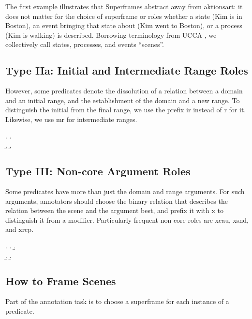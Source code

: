 \documentclass[a4paper]{article}
\begin{document}
The first example illustrates that Superframes abstract away from aktionsart: it does not matter for the choice of superframe or roles whether a state (Kim is in Boston), an event bringing that state about (Kim went to Boston), or a process (Kim is walking) is described. Borrowing terminology from UCCA \citep{abend-rappoport-2013-universal}, we collectively call states, processes, and events ``scenes''.

\subsection{Type IIa: Initial and Intermediate Range Roles}

However, some predicates denote the dissolution of a relation between a domain and an initial range, and the establishment of the domain and a new range. To distinguish the initial from the final range, we use the prefix \textsf{ir} instead of \textsf{r} for it. Likewise, we use \textsf{mr} for intermediate ranges.

\ex. \a. \\
     \b. 
     \b. 

\subsection{Type III: Non-core Argument Roles}

Some predicates have more than just the domain and range arguments. For such arguments, annotators should choose the binary relation that describes the relation between the scene and the argument best, and prefix it with \textsf{x} to distinguish it from a modifier. Particularly frequent non-core roles are \textsf{xcau}, \textsf{xsnd}, and \textsf{xrcp}.

\ex. \a. 
     \b. \\
     \b. 
     \b. 

\subsection{How to Frame Scenes}

Part of the annotation task is to choose a superframe for each instance of a predicate.
\end{document}
